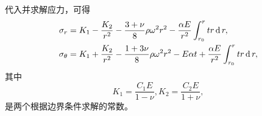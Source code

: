 代入并求解应力，可得
\begin{equation}
    \begin{aligned}
        \sigma_r &= K_1 - \frac{K_2}{r^2} -\frac{3+\nu}{8} \rho \omega^2 r^2 - \frac{\alpha E}{r^2} \int_{r_0}^r tr \operatorname{\mathop{} \! \mathrm{d}} r, \\
        \sigma_\theta & = K_1 + \frac{K_2}{r^2} -\frac{1+3\nu}{8} \rho \omega^2 r^2  - E \alpha t + \frac{\alpha E}{r^2} \int_{r_0}^r tr \operatorname{\mathop{} \! \mathrm{d}} r,
    \end{aligned}
\end{equation}
其中
\begin{equation}
    K_1 = \frac{C_1 E}{1-\nu}, K_2 = \frac{C_2 E}{1 + \nu},
\end{equation}
是两个根据边界条件求解的常数。
